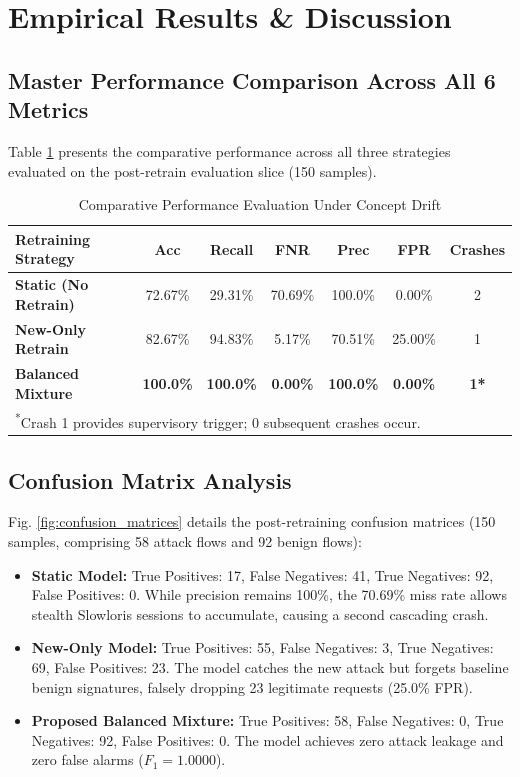 \documentclass[conference]{IEEEtran}
\begin{document}
\section{Empirical Results \& Discussion}

\subsection{Master Performance Comparison Across All 6 Metrics}
Table \ref{tab:master_results} presents the comparative performance across all three strategies evaluated on the post-retrain evaluation slice (150 samples).

\begin{table}[htbp]
\caption{Comparative Performance Evaluation Under Concept Drift}
\begin{center}
\begin{tabular}{lcccccc}
\toprule
\textbf{Retraining Strategy} & \textbf{Acc} & \textbf{Recall} & \textbf{FNR} & \textbf{Prec} & \textbf{FPR} & \textbf{Crashes} \\
\midrule
\textbf{Static (No Retrain)} & 72.67\% & 29.31\% & 70.69\% & 100.0\% & 0.00\% & 2 \\
\textbf{New-Only Retrain}    & 82.67\% & 94.83\% & 5.17\%  & 70.51\% & 25.00\% & 1 \\
\textbf{Balanced Mixture}   & \textbf{100.0\%} & \textbf{100.0\%} & \textbf{0.00\%} & \textbf{100.0\%} & \textbf{0.00\%} & \textbf{1*} \\
\bottomrule
\multicolumn{7}{l}{\textsuperscript{*}\footnotesize{Crash 1 provides supervisory trigger; 0 subsequent crashes occur.}}
\end{tabular}
\label{tab:master_results}
\end{center}
\end{table}

\subsection{Confusion Matrix Analysis}
Fig. \ref{fig:confusion_matrices} details the post-retraining confusion matrices (150 samples, comprising 58 attack flows and 92 benign flows):

\begin{itemize}
    \item \textbf{Static Model:} True Positives: 17, False Negatives: 41, True Negatives: 92, False Positives: 0. While precision remains 100\%, the 70.69\% miss rate allows stealth Slowloris sessions to accumulate, causing a second cascading crash.
    \item \textbf{New-Only Model:} True Positives: 55, False Negatives: 3, True Negatives: 69, False Positives: 23. The model catches the new attack but forgets baseline benign signatures, falsely dropping 23 legitimate requests (25.0\% FPR).
    \item \textbf{Proposed Balanced Mixture:} True Positives: 58, False Negatives: 0, True Negatives: 92, False Positives: 0. The model achieves zero attack leakage and zero false alarms ($F_1 = 1.0000$).
\end{itemize}
\end{document}
